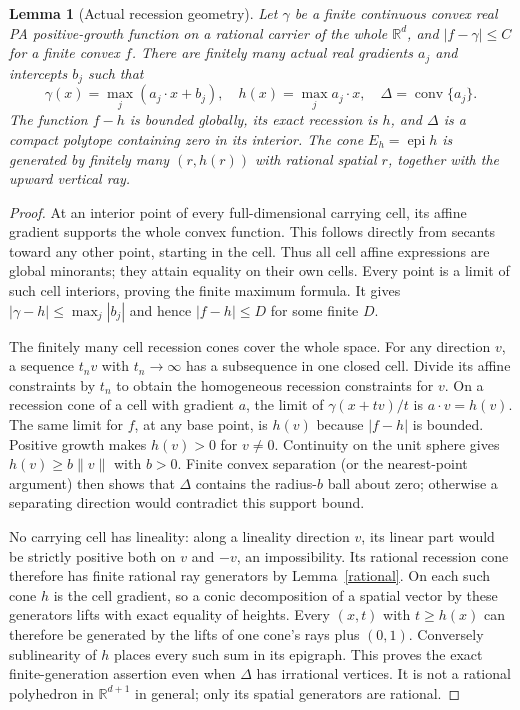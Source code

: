 \documentclass[11pt]{article}
\newtheorem{lemma}[theorem]{Lemma}
\newcommand{\R}{\mathbb R}
\newcommand{\epi}{\operatorname{epi}}
\newcommand{\conv}{\operatorname{conv}}
\begin{document}
\begin{lemma}[Actual recession geometry]\label{recession}
Let $\gamma$ be a finite continuous convex real PA positive-growth function on a rational carrier of the whole $\R^d$, and $|f-\gamma|\leq C$ for a finite convex $f$. There are finitely many actual real gradients $a_j$ and intercepts $b_j$ such that
\[
 \gamma(x)=\max_j(a_j\cdot x+b_j),\quad
 h(x)=\max_j a_j\cdot x,\quad \Delta=\conv\{a_j\}.
\]
The function $f-h$ is bounded globally, its exact recession is $h$, and $\Delta$ is a compact polytope containing zero in its interior. The cone $E_h=\epi h$ is generated by finitely many $(r,h(r))$ with rational spatial $r$, together with the upward vertical ray.
\end{lemma}
\begin{proof}
At an interior point of every full-dimensional carrying cell, its affine gradient supports the whole convex function. This follows directly from secants toward any other point, starting in the cell. Thus all cell affine expressions are global minorants; they attain equality on their own cells. Every point is a limit of such cell interiors, proving the finite maximum formula. It gives $|\gamma-h|\leq\max_j|b_j|$ and hence $|f-h|\leq D$ for some finite $D$.

The finitely many cell recession cones cover the whole space. For any direction $v$, a sequence $t_nv$ with $t_n\to\infty$ has a subsequence in one closed cell. Divide its affine constraints by $t_n$ to obtain the homogeneous recession constraints for $v$. On a recession cone of a cell with gradient $a$, the limit of $\gamma(x+tv)/t$ is $a\cdot v=h(v)$. The same limit for $f$, at any base point, is $h(v)$ because $|f-h|$ is bounded. Positive growth makes $h(v)>0$ for $v\ne0$. Continuity on the unit sphere gives $h(v)\geq b\|v\|$ with $b>0$. Finite convex separation (or the nearest-point argument) then shows that $\Delta$ contains the radius-$b$ ball about zero; otherwise a separating direction would contradict this support bound.

No carrying cell has lineality: along a lineality direction $v$, its linear part would be strictly positive both on $v$ and $-v$, an impossibility. Its rational recession cone therefore has finite rational ray generators by Lemma~\ref{rational}. On each such cone $h$ is the cell gradient, so a conic decomposition of a spatial vector by these generators lifts with exact equality of heights. Every $(x,t)$ with $t\geq h(x)$ can therefore be generated by the lifts of one cone's rays plus $(0,1)$. Conversely sublinearity of $h$ places every such sum in its epigraph. This proves the exact finite-generation assertion even when $\Delta$ has irrational vertices. It is not a rational polyhedron in $\R^{d+1}$ in general; only its spatial generators are rational.
\end{proof}
\end{document}
